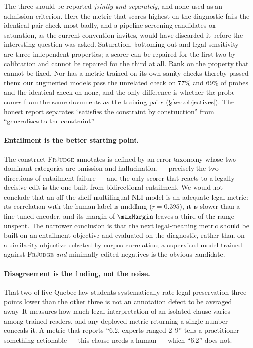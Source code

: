 \documentclass[11pt]{article}
\begin{document}
The three should be reported \emph{jointly and separately}, and none used as an
admission criterion. Here the metric that scores highest on the diagnostic fails
the identical-pair check most badly, and a pipeline screening candidates on
saturation, as the current convention invites, would have discarded it before
the interesting question was asked. Saturation, bottoming out and legal
sensitivity are three independent properties; a scorer can be repaired for the
first two by calibration and cannot be repaired for the third at all. Rank on
the property that cannot be fixed. Nor has a metric trained on its own sanity
checks thereby passed them: our augmented models pass the unrelated check on
$77\%$ and $69\%$ of probes and the identical check on none, and the only
difference is whether the probe comes from the same documents as the training
pairs (\S\ref{sec:objectives}). The honest report separates ``satisfies the
constraint by construction'' from ``generalises to the constraint''.

\paragraph{Entailment is the better starting point.}
The construct \textsc{FrJudge} annotates is defined by an error taxonomy whose
two dominant categories are omission and hallucination --- precisely the two
directions of entailment failure --- and the only scorer that reacts to a
legally decisive edit is the one built from bidirectional entailment. We would
not conclude that an off-the-shelf multilingual NLI model is an adequate legal
metric: its correlation with the human label is middling ($r=0.395$), it is
slower than a fine-tuned encoder, and its margin of $\maxMargin$ leaves a third
of the range unspent. The narrower conclusion is that the next legal-meaning
metric should be built on an entailment objective and evaluated on the
diagnostic, rather than on a similarity objective selected by corpus
correlation; a supervised model trained against \textsc{FrJudge} \emph{and}
minimally-edited negatives is the obvious candidate.

\paragraph{Disagreement is the finding, not the noise.}
That two of five Quebec law students systematically rate legal preservation
three points lower than the other three is not an annotation defect to be
averaged away. It measures how much legal interpretation of an isolated clause
varies among trained readers, and any deployed metric returning a single number
conceals it. A metric that reports ``6.2, experts ranged 2--9'' tells a
practitioner something actionable --- this clause needs a human --- which
``6.2'' does not.
\end{document}
